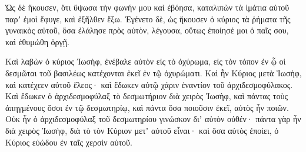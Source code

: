 {Ὡς δὲ ἤκουσεν, ὅτι ὕψωσα τὴν φωνήν μου καὶ ἐβόησα, καταλιπὼν τὰ ἱμάτια αὐτοῦ παρʼ ἐμοὶ ἔφυγε, καὶ ἐξῆλθεν ἔξω.
Ἐγένετο δὲ, ὡς ἤκουσεν ὁ κύριος τὰ ῥήματα τῆς γυναικὸς αὐτοῦ, ὅσα ἐλάλησε πρὸς αὐτὸν, λέγουσα, οὕτως ἐποίησέ μοι ὁ παῖς σου, καὶ ἐθυμώθη ὀργῇ.
\par }{\PP {}Καὶ λαβὼν ὁ κύριος Ἰωσὴφ, ἐνέβαλε αὐτὸν εἰς τὸ ὀχύρωμα, εἰς τὸν τόπον ἐν ᾧ οἱ δεσμῶται τοῦ βασιλέως κατέχονται ἐκεῖ ἐν τῷ ὀχυρώματι.
Καὶ ἦν Κύριος μετὰ Ἰωσὴφ, καὶ κατέχεεν αὐτοῦ ἔλεος· καὶ ἔδωκεν αὐτῷ χάριν ἐναντίον τοῦ ἀρχιδεσμοφύλακος.
Καὶ ἔδωκεν ὁ ἀρχιδεσμοφύλαξ τὸ δεσμωτήριον διὰ χειρὸς Ἰωσὴφ, καὶ πάντας τοὺς ἀπηγμένους ὅσοι ἐν τῷ δεσμωτηρίῳ, καὶ πάντα ὅσα ποιοῦσιν ἐκεῖ, αὐτὸς ἦν ποιῶν.
Οὐκ ἦν ὁ ἀρχιδεσμοφύλαξ τοῦ δεσμωτηρίου γινώσκον διʼ αὐτὸν οὐθέν· πάντα γὰρ ἦν διὰ χειρὸς Ἰωσὴφ, διὰ τὸ τὸν Κύριον μετʼ αὐτοῦ εἶναι· καὶ ὅσα αὐτὸς ἐποίει, ὁ Κύριος εὐώδου ἐν ταῖς χερσὶν αὐτοῦ.

}
